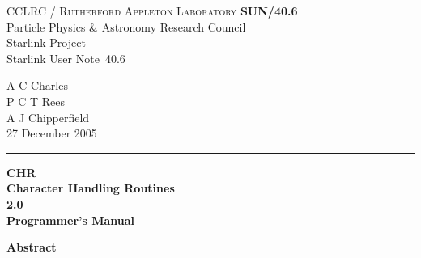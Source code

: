\documentclass[twoside,11pt]{article}
\newcommand{\stardoccategory}  {Starlink User Note}
\newcommand{\stardocinitials}  {SUN}
\newcommand{\stardocnumber}    {40.6}
\newcommand{\stardocauthors}   {A C Charles\\P C T Rees\\A J Chipperfield }
\newcommand{\stardocdate}      {27 December 2005}
\newcommand{\stardoctitle}     {CHR \\ [\latex{1ex}]
                                Character Handling Routines}
\newcommand{\stardocversion}   {2.0}
\newcommand{\stardocmanual}    {Programmer's Manual}
\newcommand{\stardocname}{\stardocinitials /\stardocnumber}
\newenvironment{latexonly}{}{}
\newcommand{\latex}[1]{#1}
\renewcommand{\_}{\texttt{\symbol{95}}}
\begin{document}
\thispagestyle{empty}

\begin{latexonly}
   CCLRC / \textsc{Rutherford Appleton Laboratory} \hfill \textbf{\stardocname}\\
   {\large Particle Physics \& Astronomy Research Council}\\
   {\large Starlink Project\\}
   {\large \stardoccategory\ \stardocnumber}
   \begin{flushright}
   \stardocauthors\\
   \stardocdate
   \end{flushright}
   \vspace{-4mm}
   \rule{\textwidth}{0.5mm}
   \vspace{5mm}
   \begin{center}
   {\Huge\textbf{\stardoctitle \\ [2.5ex]}}
   {\LARGE\textbf{\stardocversion \\ [4ex]}}
   {\Huge\textbf{\stardocmanual}}
   \end{center}
   \vspace{5mm}


   \vspace{10mm}
   \begin{center}
      {\Large\textbf{Abstract}}
   \end{center}
\end{latexonly}
\end{document}
